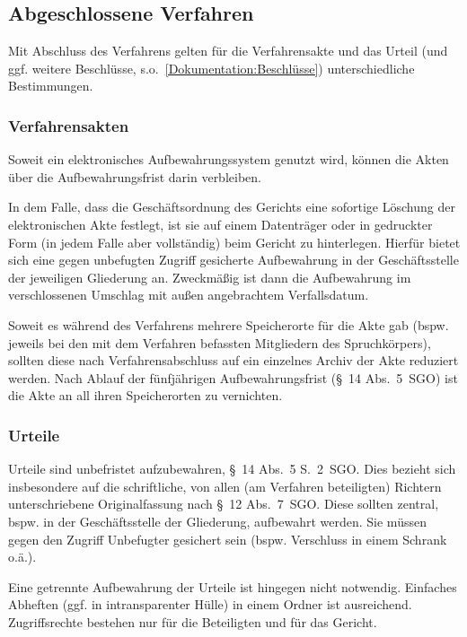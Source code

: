\subsection{Abgeschlossene Verfahren}
Mit Abschluss des Verfahrens gelten für die Verfahrensakte und das Urteil (und ggf. weitere Beschlüsse, s.o.~\ref{Dokumentation:Beschlüsse}) unterschiedliche Bestimmungen.

\subsubsection{Verfahrensakten}
Soweit ein elektronisches Aufbewahrungssystem genutzt wird, können die Akten über die Aufbewahrungsfrist darin verbleiben.

In dem Falle, dass die Geschäftsordnung des Gerichts eine sofortige Löschung der elektronischen Akte festlegt, ist sie auf einem Datenträger oder in gedruckter Form (in jedem Falle aber vollständig) beim Gericht zu hinterlegen.
Hierfür bietet sich eine gegen unbefugten Zugriff gesicherte Aufbewahrung in der Geschäftsstelle der jeweiligen Gliederung an.
Zweckmäßig ist dann die Aufbewahrung im verschlossenen Umschlag mit außen angebrachtem Verfallsdatum.

Soweit es während des Verfahrens mehrere Speicherorte für die Akte gab (bspw. jeweils bei den mit dem Verfahren befassten Mitgliedern des Spruchkörpers), sollten diese nach Verfahrensabschluss auf ein einzelnes Archiv der Akte reduziert werden.
Nach Ablauf der fünfjährigen Aufbewahrungsfrist (\S~14 Abs.~5~SGO) ist die Akte an all ihren Speicherorten zu vernichten.

\subsubsection{Urteile}
Urteile sind unbefristet aufzubewahren, \S~14 Abs.~5 S.~2~SGO.
Dies bezieht sich insbesondere auf die schriftliche, von allen (am Verfahren beteiligten) Richtern unterschriebene Originalfassung nach \S~12 Abs.~7~SGO.
Diese sollten zentral, bspw. in der Geschäftsstelle der Gliederung, aufbewahrt werden.
Sie müssen gegen den Zugriff Unbefugter gesichert sein (bspw. Verschluss in einem Schrank o.ä.).

Eine getrennte Aufbewahrung der Urteile ist hingegen nicht notwendig.
Einfaches Abheften (ggf. in intransparenter Hülle) in einem Ordner ist ausreichend.
Zugriffsrechte bestehen nur für die Beteiligten und für das Gericht.

